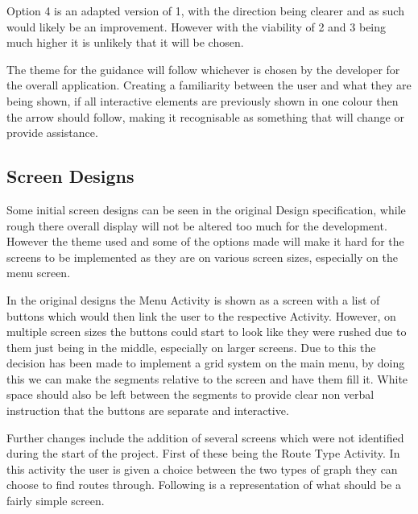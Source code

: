 Option 4 is an adapted version of 1, with the direction being clearer and as such would likely be an improvement. However with the viability of 2 and 3 being much higher it is unlikely that it will be chosen.

The theme for the guidance will follow whichever is chosen by the developer for the overall application. Creating a familiarity between the user and what they are being shown, if all interactive elements are previously shown in one colour then the arrow should follow, making it recognisable as something that will change or provide assistance. 
\subsection{Screen Designs}
Some initial screen designs can be seen in the original Design specification, while rough there overall display will not be altered too much for the development. However the theme used and some of the options made will make it hard for the screens to be implemented as they are on various screen sizes, especially on the menu screen.

In the original designs the Menu Activity is shown as a screen with a list of buttons which would then link the user to the respective Activity. However, on multiple screen sizes the buttons could start to look like they were rushed due to them just being in the middle, especially on larger screens. Due to this the decision has been made to implement a grid system on the main menu, by doing this we can make the segments relative to the screen and have them fill it. White space should also be left between the segments to provide clear non verbal instruction that the buttons are separate and interactive. 

Further changes include the addition of several screens which were not identified during the start of the project. First of these being the Route Type Activity. In this activity the user is given a choice between the two types of graph they can choose to find routes through. Following is a representation of what should be a fairly simple screen.

